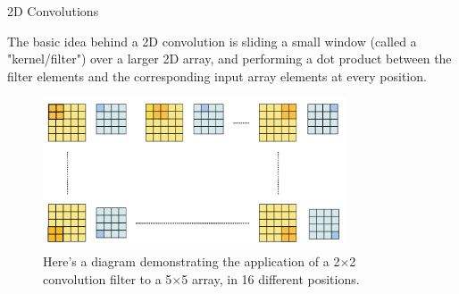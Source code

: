 \begin{vbframe}{2D Convolutions}

The basic idea behind a 2D convolution is sliding a small window (called a "kernel/filter") over a larger 2D array, and performing a dot product between the filter elements and the corresponding input array elements at every position.
    \begin{figure}
        \centering
        \includegraphics[width=9cm]{figure/padding3.png}
        \caption{\tiny Here's a diagram demonstrating the application of a 2$\times$2 convolution filter to a 5$\times$5 array, in 16 different positions.}
    \end{figure}
\end{vbframe}

